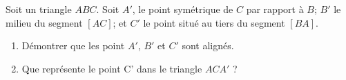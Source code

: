 
\begin{exercice}\label{exosmath-0010}

    Soit un triangle \( ABC\). Soit \( A'\), le point symétrique de \( C\) par rapport à \( B\); \( B'\) le milieu du segment \( [AC]\); et \( C'\) le point situé au tiers du segment \( [BA]\).
    \begin{enumerate}
        \item
 
  Démontrer que les point $A'$, $B'$ et $C'$ sont alignés.
  \item

    Que représente le point C' dans le triangle \( ACA'\) ?
            
    \end{enumerate}

\end{exercice}
